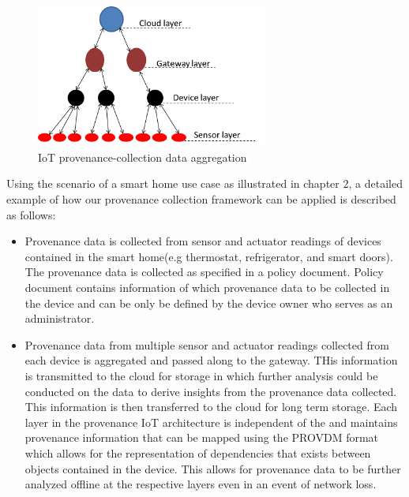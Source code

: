 \begin{figure}[h!]
\begin{center}

\includegraphics[width=3.0in]{iot.PNG}    
\end{center}
\caption{IoT provenance-collection data aggregation}
\label{autom}
\end{figure}


Using the scenario of a smart home use case as illustrated in chapter 2, a detailed example of how our provenance collection framework can be applied is described as follows:

\begin{itemize}

\item Provenance data is collected from sensor and actuator readings of devices contained in the smart home(e.g thermostat, refrigerator, and smart doors). The provenance data is collected as specified in a policy document. Policy document contains information of which provenance data to be collected in the device and can be only be defined by the device owner who serves as an administrator. 

\item Provenance data from multiple sensor and actuator readings collected from each device is aggregated and passed along to the gateway. THis information is transmitted to the cloud for storage in which further analysis could be conducted on the data to derive insights from the provenance data collected. This information is then transferred to the cloud for long term storage. Each layer in the provenance IoT architecture is independent of the and maintains provenance information that can be mapped using the PROV\-DM format which allows for the representation of dependencies that exists between objects contained in the device. This allows for provenance data to be further analyzed offline at the respective layers even in an event of network loss. 

\end{itemize}





